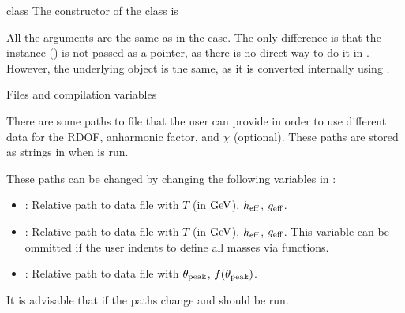 \documentclass[10pt,utf8,compress,xcolor=dvipsnames]{beamer}
\begin{document}
\begin{frame}{ class}
	\fontB
	The constructor of the  class is
	\lstset{language = python}
	
	
	All the arguments are the same as in the \CPP case. The only difference is that the  instance () is not
	passed as a pointer, as there is no direct way to do it in \PY. However, the underlying object is the same, as it is converted internally using .
\end{frame}



\begin{frame}[noframenumbering]
	\begin{center}
		{\color{yellow} \Huge Files and compilation variables}
	\end{center}
\end{frame}
%

\begin{frame}{}
	There are some paths to file that the user can provide in order to use different data for the RDOF, anharmonic factor, and $\chi$ (optional). 
	These paths are stored as strings in  when  is run.
	
	These paths can be changed by changing the following variables in :
	\begin{itemize}
		\item {}: Relative path to data file with $T$ (in ${\rm GeV}$), $h_{\rm eff}{}$, $g_{\rm eff}{}$.
		\item {}: Relative path to data file with $T$ (in ${\rm GeV}$), $h_{\rm eff}{}$, $g_{\rm eff}{}$. This variable can be ommitted if the user indents to define all masses via functions. 
		\item {}: Relative path to data file with $\theta_{\rm peak}{}$, $f(\theta_{\rm peak}{})$.
	\end{itemize} 
	
	It is advisable that if the paths change  and  should be run.	
\end{frame}
\end{document}
